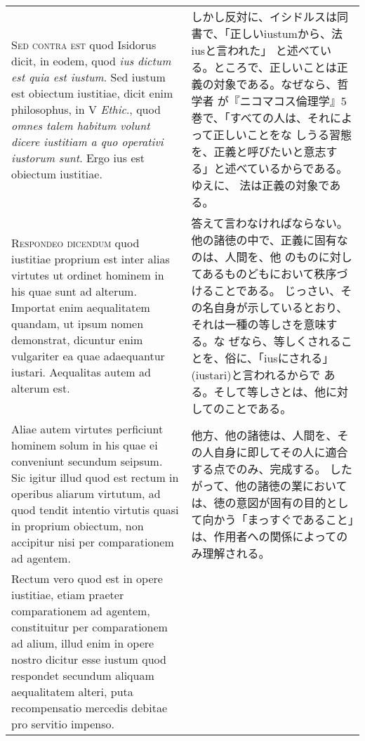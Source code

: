 \documentclass[10pt]{jsarticle} %
\begin{document}
\begin{longtable}{p{21em}p{21em}}
\\



{\scshape Sed contra est} quod Isidorus dicit, in eodem, quod {\itshape
 ius dictum est quia est iustum}. Sed iustum est obiectum iustitiae,
 dicit enim philosophus, in V {\itshape Ethic}., quod {\itshape omnes
 talem habitum volunt dicere iustitiam a quo operativi iustorum
 sunt}. Ergo ius est obiectum iustitiae.


&
しかし反対に、イシドルスは同書で、「正しいiustumから、法iusと言われた」
 と述べている。ところで、正しいことは正義の対象である。なぜなら、哲学者
 が『ニコマコス倫理学』5巻で、「すべての人は、それによって正しいことをな
 しうる習態を、正義と呼びたいと意志する」と述べているからである。ゆえに、
 法は正義の対象である。

\\



{\scshape Respondeo dicendum} quod iustitiae proprium est inter alias
 virtutes ut ordinet hominem in his quae sunt ad alterum. Importat enim
 aequalitatem quandam, ut ipsum nomen demonstrat, dicuntur enim
 vulgariter ea quae adaequantur iustari. Aequalitas autem ad alterum
 est. 

&

答えて言わなければならない。他の諸徳の中で、正義に固有なのは、人間を、他
 のものに対してあるものどもにおいて秩序づけることである。
じっさい、その名自身が示しているとおり、それは一種の等しさを意味する。な
 ぜなら、等しくされることを、俗に、「iusにされる」(iustari)と言われるからで
 ある。そして等しさとは、他に対してのことである。

\\

Aliae autem virtutes perficiunt hominem solum in his quae ei
 conveniunt secundum seipsum. Sic igitur illud quod est rectum in
 operibus aliarum virtutum, ad quod tendit intentio virtutis quasi in
 proprium obiectum, non accipitur nisi per comparationem ad
 agentem. 

&

他方、他の諸徳は、人間を、その人自身に即してその人に適合する点でのみ、完成する。
したがって、他の諸徳の業においては、徳の意図が固有の目的として向かう「まっすぐであること」は、作用者への関係によってのみ理解される。


\\


Rectum vero quod est in opere iustitiae, etiam praeter
 comparationem ad agentem, constituitur per comparationem ad alium,
 illud enim in opere nostro dicitur esse iustum quod respondet secundum
 aliquam aequalitatem alteri, puta recompensatio mercedis debitae pro
 servitio impenso. 


\end{longtable}
\end{document}
